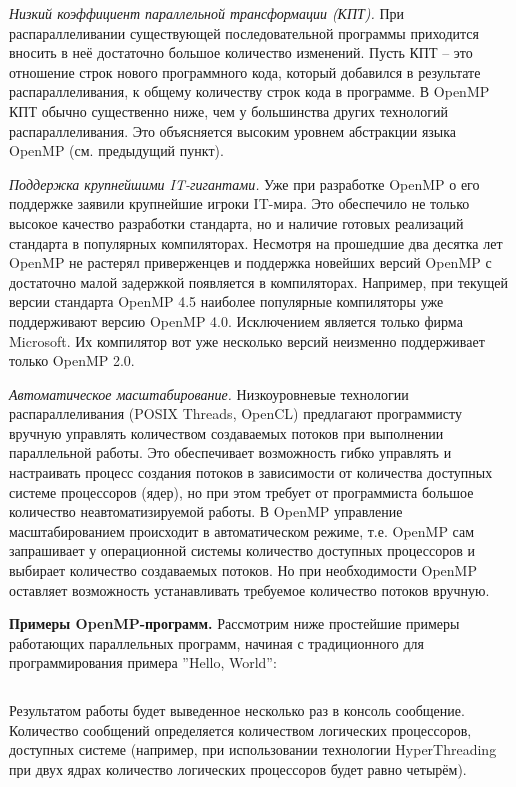 \textit{Низкий коэффициент параллельной трансформации (КПТ).} При распараллеливании существующей последовательной программы приходится вносить в неё достаточно большое количество изменений. Пусть КПТ -- это отношение строк нового программного кода, который добавился в результате распараллеливания, к общему количеству строк кода в программе. В OpenMP КПТ обычно существенно ниже, чем у большинства других технологий распараллеливания. Это объясняется высоким уровнем абстракции языка OpenMP (см. предыдущий пункт). 

\textit{Поддержка крупнейшими  IT-гигантами.} Уже при разработке Open\-MP о его поддержке заявили крупнейшие игроки IT-мира. Это обеспечило не только высокое качество разработки стандарта, но и наличие готовых реализаций стандарта в популярных компиляторах. Несмотря на прошедшие два десятка лет OpenMP не растерял приверженцев и поддержка новейших версий OpenMP с достаточно малой задержкой появляется в компиляторах. Например, при текущей версии стандарта OpenMP 4.5 наиболее популярные компиляторы уже поддерживают версию OpenMP 4.0. Исключением является только фирма Microsoft. Их компилятор вот уже несколько версий неизменно поддерживает только OpenMP 2.0. 

\textit{Автоматическое масштабирование.}  Низкоуровневые технологии распараллеливания (POSIX Threads, OpenCL) предлагают программисту вручную управлять количеством создаваемых потоков при выполнении параллельной работы. Это обеспечивает возможность гибко управлять и настраивать процесс создания потоков в зависимости от количества доступных системе процессоров (ядер), но при этом требует от программиста большое количество неавтоматизируемой работы. В OpenMP управление масштабированием происходит в автоматическом режиме, т.е. OpenMP сам запрашивает у операционной системы количество доступных процессоров и выбирает количество создаваемых потоков. Но при необходимости OpenMP оставляет возможность устанавливать требуемое количество потоков вручную.

\textbf{Примеры OpenMP-программ.} Рассмотрим ниже простейшие примеры работающих параллельных программ, начиная с традиционного для программирования примера ''Hello, World'':
\inputminted{c++}{listings/OpenMPExample1.cpp}

Результатом работы будет выведенное несколько раз в консоль сообщение. Количество сообщений определяется количеством логических процессоров, доступных системе (например, при использовании технологии HyperThreading при двух ядрах количество логических процессоров будет равно четырём). 

